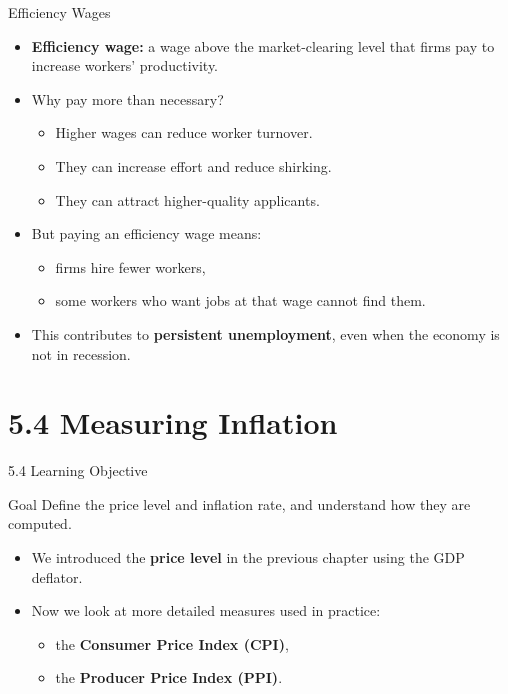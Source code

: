 \documentclass[aspectratio=169]{beamer}
\begin{document}
\begin{frame}{Efficiency Wages}
\transfade
\begin{itemize}
  \item \textbf{Efficiency wage:} a wage above the market-clearing level that firms pay to increase workers’ productivity.
  \item Why pay more than necessary?
  \begin{itemize}
    \item Higher wages can reduce worker turnover.
    \item They can increase effort and reduce shirking.
    \item They can attract higher-quality applicants.
  \end{itemize}
  \item But paying an efficiency wage means:
  \begin{itemize}
    \item firms hire fewer workers,
    \item some workers who want jobs at that wage cannot find them.
  \end{itemize}
  \item This contributes to \textbf{persistent unemployment}, even when the economy is not in recession.
\end{itemize}
\end{frame}

\section{5.4 Measuring Inflation}

\begin{frame}{5.4 Learning Objective}
\transfade
\begin{block}{Goal}
Define the price level and inflation rate, and understand how they are computed.
\end{block}
\begin{itemize}
  \item We introduced the \textbf{price level} in the previous chapter using the GDP deflator.
  \item Now we look at more detailed measures used in practice:
  \begin{itemize}
    \item the \textbf{Consumer Price Index (CPI)},
    \item the \textbf{Producer Price Index (PPI)}.
  \end{itemize}
\end{itemize}
\end{frame}
\end{document}
